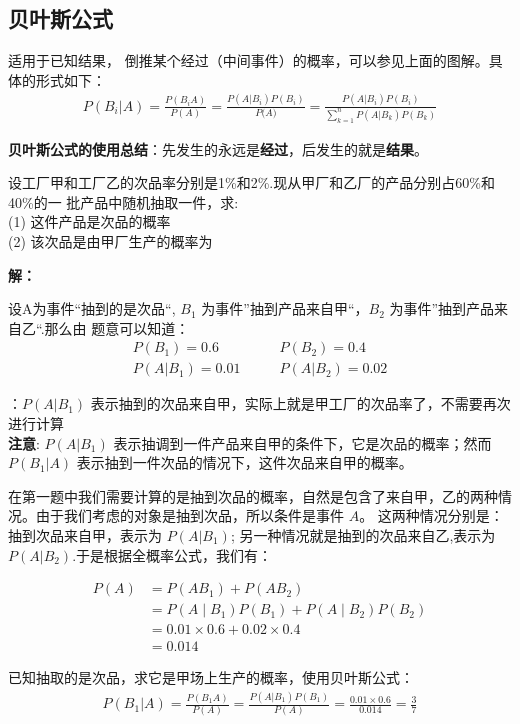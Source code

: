 \subsection{贝叶斯公式}
适用于已知结果， 倒推某个经过（中间事件）的概率，可以参见上面的图解。具体的形式如下：
\begin{align}
    P(B_{i}\big|A)=\frac{P(B_{i}A)}{P(A)}=\frac{P(A\big|B_{i})P(B_{i})}{P\big(A\big)}= \frac{P(A\big|B_{i})P(B_{i})}{\sum\limits_{k=1}^nP(A|B_k)P(B_k)}
\end{align}


{\bf 贝叶斯公式的使用总结}：先发生的永远是{\bf 经过}，后发生的就是{\bf 结果}。


设工厂甲和工厂乙的次品率分别是1\%和2\%.现从甲厂和乙厂的产品分别占60\%和40\%的一
批产品中随机抽取一件，求:\\
(1) 这件产品是次品的概率\\
(2) 该次品是由甲厂生产的概率为

{\bf 解：}

设A为事件“抽到的是次品“, $B_1$ 为事件”抽到产品来自甲“，$B_2$ 为事件”抽到产品来自乙“.那么由
题意可以知道：
\begin{align*}
P(B_1) = 0.6 & \qquad P(B_2) = 0.4\\
P(A|B_1) = 0.01 & \qquad P(A|B_2) = 0.02
\end{align*}

：$P(A|B_1)$ 表示抽到的次品来自甲，实际上就是甲工厂的次品率了，不需要再次进行计算\\
{\bf 注意}: $P(A|B_1)$ 表示抽调到一件产品来自甲的条件下，它是次品的概率；然而 $P(B_1|A)$ 表示抽到一件次品的情况下，这件次品来自甲的概率。


在第一题中我们需要计算的是抽到次品的概率，自然是包含了来自甲，乙的两种情况。由于我们考虑的对象是抽到次品，所以条件是事件 $A$。 
这两种情况分别是：抽到次品来自甲，表示为 $P(A|B_1)$; 另一种情况就是抽到的次品来自乙,表示为 $P(A|B_2)$.于是根据全概率公式，我们有：


\begin{align*}
P(A)& = P(AB_1) + P(AB_2)\\
& =P\left(A \mid B_1\right) P\left(B_1\right) + P\left(A \mid B_2\right) P\left(B_2\right) \\
& =0.01 \times 0.6 + 0.02 \times 0.4 \\
& =0.014
\end{align*}

已知抽取的是次品，求它是甲场上生产的概率，使用贝叶斯公式：
\begin{align*}
P(B_1|A) = \frac{P(B_1A)}{P(A)} = \frac{P(A|B_1)P(B_1)}{P(A)}= \frac{0.01\times 0.6}{0.014}=\frac37
\end{align*}

